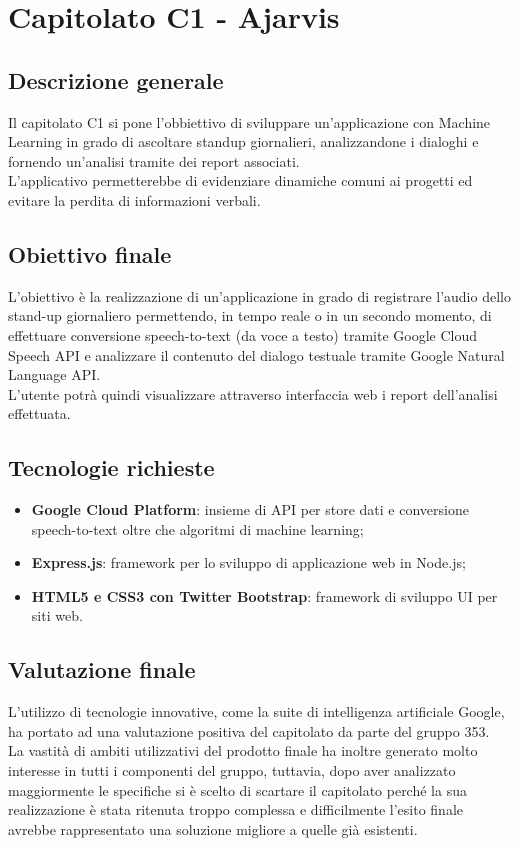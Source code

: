 \documentclass[StudioDiFattibilità.tex]{subfiles}
\begin{document}
	\chapter{Capitolato C1 - Ajarvis}
	\section{Descrizione generale}
	Il capitolato C1 si pone l'obbiettivo di sviluppare un'applicazione con Machine Learning in grado di ascoltare standup giornalieri, analizzandone i dialoghi e fornendo un'analisi tramite dei report associati.\\
	L'applicativo permetterebbe di evidenziare dinamiche comuni ai progetti ed evitare la perdita di informazioni verbali.
	
	\section{Obiettivo finale}
	L'obiettivo è la realizzazione di un'applicazione in grado di registrare l'audio dello stand-up giornaliero permettendo, in tempo reale o in un secondo momento, di effettuare conversione speech-to-text (da voce a testo) tramite Google Cloud Speech API e analizzare il contenuto del dialogo testuale tramite Google Natural Language API.\\
	L'utente potrà quindi visualizzare attraverso interfaccia web i report dell'analisi effettuata. 
	
	\section{Tecnologie richieste}
	\begin{itemize}
		\item \textbf{Google Cloud Platform}: insieme di API per store dati e conversione speech-to-text oltre che algoritmi di machine learning;
		\item \textbf{Express.js}: framework per lo sviluppo di applicazione web in Node.js;
		\item \textbf{HTML5 e CSS3 con Twitter Bootstrap}: framework di sviluppo UI per siti web.
	\end{itemize}
	
	\section{Valutazione finale}
	L'utilizzo di tecnologie innovative, come la suite di intelligenza artificiale Google, ha portato ad una valutazione positiva del capitolato da parte del gruppo 353.\\
	La vastità di ambiti utilizzativi del prodotto finale ha inoltre generato molto interesse in tutti i componenti del gruppo, tuttavia, dopo aver analizzato maggiormente le specifiche si è scelto di scartare il capitolato perché la sua realizzazione è stata ritenuta troppo complessa e difficilmente l'esito finale avrebbe rappresentato una soluzione migliore a quelle già esistenti.
	
\end{document}
